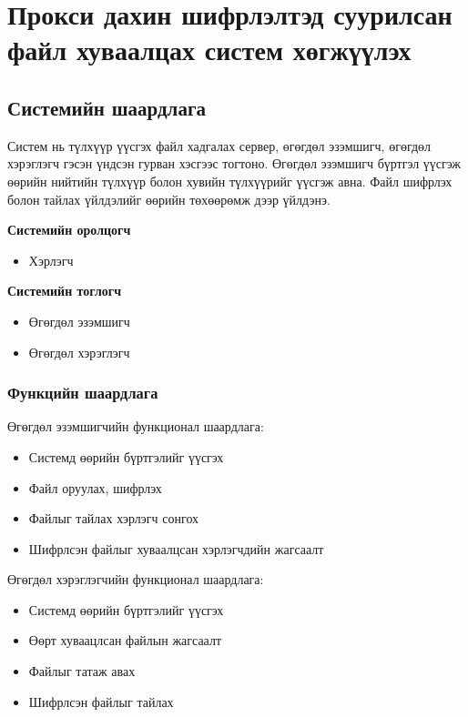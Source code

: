 
\chapter{Прокси дахин шифрлэлтэд суурилсан файл хуваалцах систем хөгжүүлэх}

\label{Chapter3} %
\pagecolor{white}

\section{Системийн шаардлага}
Систем нь түлхүүр үүсгэх файл хадгалах сервер, өгөгдөл эзэмшигч, өгөгдөл хэрэглэгч гэсэн үндсэн гурван хэсгээс тогтоно. Өгөгдөл эзэмшигч бүртгэл үүсгэж өөрийн нийтийн түлхүүр болон хувийн түлхүүрийг үүсгэж авна. Файл шифрлэх болон тайлах үйлдэлийг өөрийн төхөөрөмж дээр үйлдэнэ.

\textbf{Системийн оролцогч}
\begin{itemize}
    \item Хэрлэгч
\end{itemize}

\textbf{Системийн тоглогч}
\begin{itemize}
    \item Өгөгдөл эзэмшигч
    \item Өгөгдөл хэрэглэгч
\end{itemize}

\subsection*{Функцийн шаардлага}
Өгөгдөл эзэмшигчийн функционал шаардлага:
\begin{itemize}
    \item Системд өөрийн бүртгэлийг үүсгэх
    \item Файл оруулах, шифрлэх
    \item Файлыг тайлах хэрлэгч сонгох
    \item Шифрлсэн файлыг хуваалцсан хэрлэгчдийн жагсаалт
\end{itemize}
Өгөгдөл хэрэглэгчийн функционал шаардлага:
\begin{itemize}
    \item Системд өөрийн бүртгэлийг үүсгэх
    \item Өөрт хуваацлсан файлын жагсаалт
    \item Файлыг татаж авах
    \item Шифрлсэн файлыг тайлах
\end{itemize}

